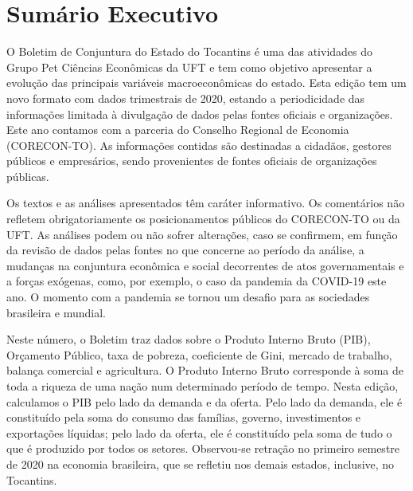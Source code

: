 \chapter*{Sumário Executivo}
\begin{center}
	\parbox{0.7\linewidth}{
		\par O Boletim de Conjuntura do Estado do Tocantins é uma das atividades do Grupo Pet Ciências Econômicas da UFT e tem como objetivo apresentar a evolução das principais variáveis macroeconômicas do estado. Esta edição tem um novo formato com dados trimestrais de 2020, estando a periodicidade das informações   limitada à divulgação de dados pelas fontes oficiais e organizações. Este ano contamos com a parceria do Conselho Regional de Economia (CORECON-TO). As informações contidas são destinadas a cidadãos, gestores públicos e empresários, sendo provenientes de fontes oficiais de organizações públicas.
		
		\par Os textos e as análises apresentados têm caráter   informativo. Os comentários não refletem obrigatoriamente os posicionamentos públicos do CORECON-TO ou da UFT. As análises podem ou não sofrer alterações, caso se confirmem, em função da revisão de dados pelas fontes no que concerne ao   período da análise, a mudanças na conjuntura econômica e social decorrentes de atos governamentais e a forças exógenas, como, por exemplo, o caso da pandemia da COVID-19 este ano. O momento com a pandemia se tornou um desafio para as sociedades brasileira e   mundial.  
		
		\par Neste número, o Boletim traz dados sobre o Produto Interno Bruto (PIB), Orçamento Público, taxa de pobreza, coeficiente de Gini, mercado de trabalho, balança comercial e agricultura. O Produto Interno Bruto corresponde à soma de toda a riqueza de uma nação num determinado período de tempo. Nesta edição, calculamos o PIB pelo lado da demanda e da oferta. Pelo lado da demanda, ele é constituído pela soma do consumo das famílias, governo, investimentos e exportações líquidas; pelo lado da oferta, ele é constituído pela    soma de tudo o que é produzido por todos os setores. Observou-se   retração no primeiro semestre de 2020 na economia brasileira, que se refletiu nos demais estados, inclusive, no Tocantins. 
		
}
\end{center}
